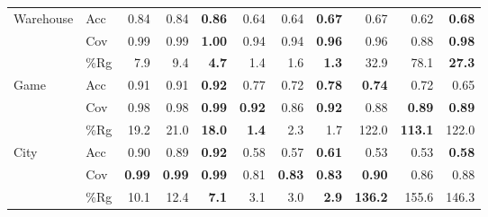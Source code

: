 \documentclass{ecai}
\begin{document}
\begin{table}[bth!]
\begin{tabular}{@{}ll|rrr|rrr|rrr@{}}
\midrule
\multirow{3}{*}{Warehouse} & Acc      & 0.84                    & 0.84                    & \textbf{0.86}           & 0.64                    & 0.64                    & \textbf{0.67}           & 0.67                    & 0.62                    & \textbf{0.68}           \\
                           & Cov      & 0.99                    & 0.99                    & \textbf{1.00}           & 0.94                    & 0.94                    & \textbf{0.96}           & 0.96                    & 0.88                    & \textbf{0.98}           \\
                           & \%Rg     & 7.9                     & 9.4                     & \textbf{4.7}            & 1.4                     & 1.6                     & \textbf{1.3}            & 32.9                    & 78.1                    & \textbf{27.3}           \\
\midrule
\multirow{3}{*}{Game}      & Acc      & 0.91                    & 0.91                    & \textbf{0.92}           & 0.77                    & 0.72                    & \textbf{0.78}           & \textbf{0.74}           & 0.72                    & 0.65                    \\
                           & Cov      & 0.98                    & 0.98                    & \textbf{0.99}           & \textbf{0.92}           & 0.86                    & \textbf{0.92}           & 0.88                    & \textbf{0.89}           & \textbf{0.89}           \\
                           & \%Rg     & 19.2                    & 21.0                    & \textbf{18.0}           & \textbf{1.4}            & 2.3                     & 1.7                     & 122.0                   & \textbf{113.1}                   & 122.0          \\
\midrule
\multirow{3}{*}{City}      & Acc      & 0.90                    & 0.89                    & \textbf{0.92}           & 0.58                    & 0.57                    & \textbf{0.61}           & 0.53                    & 0.53                    & \textbf{0.58}           \\
                           & Cov      & \textbf{0.99}           & \textbf{0.99}           & \textbf{0.99}           & 0.81                    & \textbf{0.83}           & \textbf{0.83}           & \textbf{0.90}           & 0.86                    & 0.88                    \\
                           & \%Rg     & 10.1                    & 12.4                    & \textbf{7.1}            & 3.1                     & 3.0                     & \textbf{2.9}            & \textbf{136.2}          & 155.6                   & 146.3                   \\

\end{tabular}
\end{table}
\end{document}
